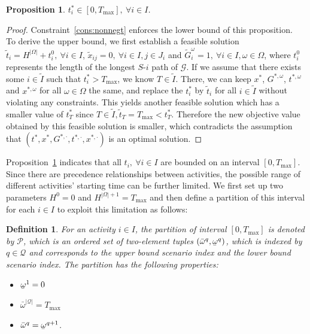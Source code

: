 \documentclass[11pt]{article}
\newtheorem{proposition}[theorem]{Proposition}
\newtheorem{definition}{Definition}
\newcommand{\noi}{\noindent}
\renewcommand{\underbar}{\underaccent{\bar}}
\begin{document}
	\begin{proposition} \label{prop:bounds}
		 \(t^*_i \in [0,T_{\max}],\ \forall i \in I\).
	\end{proposition}
	\begin{proof}
		Constraint~\eqref{cons:nonnegt} enforces the lower bound of this proposition. \\
		\newline 
		To derive the upper bound, 
		we first establish a feasible solution \(\tilde{t}_i = H^{|\Omega|} + t^0_i,\ \forall i \in I\), \(\tilde{x}_{ij} = 0,\ \forall i \in I, j \in J_i\) and \(\tilde{G}_i^\omega = 1,\ \forall i \in I, \omega \in \Omega\), where \(t^0_i\) represents the length of the longest \(S\)-\(i\) path of \(\mathcal{G}\). 
		If we assume that there exists some \(i \in \tilde{I}\) such that \(t_i^* > T_{\max}\), we know \(T \in \tilde{I}\). There, we can keep \(x^*\), \(G^{*,\omega}\), \(t^{*,\omega}\) and \(x^{*,\omega}\) for all \(\omega \in \Omega\) the same, and replace the \(t_i^*\) by \(\tilde{t}_i\) for all \(i \in \tilde{I}\) without violating any constraints. This yields another feasible solution which has a smaller value of \(t_T^*\) since \(T \in \tilde{I}, \tilde{t}_T = T_{\max} < t_T^*\). Therefore the new objective value obtained by this feasible solution is smaller, which contradicts the assumption that \((t^*,x^*,G^{*,\cdot},t^{*,\cdot},x^{*,\cdot})\) is an optimal solution.
	\end{proof}
	\noi Proposition~\ref{prop:bounds} indicates that all \(t_i,\ \forall i \in I\) are bounded on an interval \([0,T_{\max}]\). Since there are precedence relationships between activities, the possible range of different activities' starting time can be further limited. We first set up two parameters \(H^0 = 0\) and \(H^{|\Omega| + 1} = T_{\max}\) and then define a partition of this interval for each \(i \in I\) to exploit this limitation as follows:
	\begin{definition}
		For an activity \(i \in I\), the partition of interval \([0,T_{\max}]\) is denoted by \(\mathcal{P}\), which is an ordered set of two-element tuples \((\bar{\omega}^q,\underbar{\omega}^q)\), which is indexed by \(q \in \mathcal{Q}\) and corresponds to the upper bound scenario index and the lower bound scenario index. The partition has the following properties:
		\begin{itemize}
			\item \(\underbar{\omega}^1 = 0\)
			\item \(\bar{\omega}^{|\mathcal{Q}|} = T_{\max}\)
			\item \(\bar{\omega}^q = \underbar{\omega}^{q + 1}\).
		\end{itemize}
	\end{definition}
\end{document}
